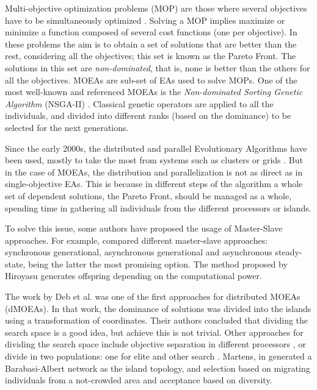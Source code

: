 \documentclass[preprint]{elsarticle}
\begin{document}
Multi-objective optimization problems (MOP) are those where several objectives have to be simultaneously optimized \citep{Mora13paretobased}. Solving a MOP implies maximize or minimize a function composed of several cost functions (one per objective). In these problems the aim is to obtain a set of solutions that are better than the rest, considering all the objectives; this set is known as the Pareto Front. The solutions in this set are {\em non-dominated}, that is, none is better than the others for all the objectives. MOEAs are sub-set of EAs used to solve MOPs. One of the most well-known and referenced MOEAs \citep{Dorronsoro13superlinear} is the {\em Non-dominated Sorting Genetic Algorithm} (NSGA-II) \citep{Deb00NSGAII}. Classical genetic operators are applied to all the individuals, and divided into different ranks (based on the dominance) to be selected for the next generations.


Since the early 2000s, the distributed and parallel Evolutionary Algorithms have been used, mostly to take the most from systems such as clusters or grids \citep{Talbi08Parallel}. But in the case of MOEAs, the distribution and parallelization is not as direct as in single-objective EAs. This is because in different steps of the algorithm a whole set of dependent solutions, the Pareto Front, should be managed as a whole, spending time in gathering all individuals from the different processors or islands.

To solve this issue, some authors have proposed the usage of Master-Slave approaches. For example,  \citep{Durillo08masterslave} compared different master-slave approaches: synchronous generational, asynchronous generational and asynchronous steady-state, being the latter the most promising option. The method proposed by Hiroyasu \citep{Hiroyasu07discussion} generates offspring depending on the computational power.

The work by Deb et al. \citep{Deb03distributed} was one of the first approaches for distributed MOEAs (dMOEAs). In that work, the dominance of solutions was divided into the islands using a transformation of coordinates. Their authors concluded that dividing the search space is a good idea, but achieve this is not trivial. Other approaches for dividing the search space include objective separation in different processors \citep{Xiao03specialized}, or divide in two populations: one for elite and other search \citep{Wang09parallel}. Martens, in \citep{Martens13asynchronous} generated a Barabasi-Albert network as the island topology, and selection based on migrating individuals from a not-crowded area and acceptance based on diversity. 
\end{document}
